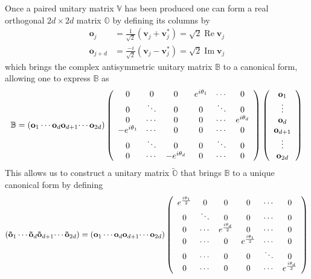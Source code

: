 \documentclass[aps,preprint]{revtex4}%
\begin{document}
Once a paired unitary matrix $\mathbb{V}$ has been produced one can form a
real orthogonal $2d\times2d$ matrix $\mathbb{O}$ by defining its columns by
\begin{align}
\mathbf{o}_{j}  &  =\frac{1}{\sqrt{2}}\left(  \mathbf{v}_{j}+\mathbf{v}%
_{j}^{\ast}\right)  =\sqrt{2}\operatorname{Re}\mathbf{v}_{j}\nonumber\\
\mathbf{o}_{j+d}  &  =\frac{-i}{\sqrt{2}}\left(  \mathbf{v}_{j}-\mathbf{v}%
_{j}^{\ast}\right)  =\sqrt{2}\operatorname{Im}\mathbf{v}_{j}%
\end{align}
which brings the complex antisymmetric unitary matrix $\mathbb{B}$ to a
canonical form, allowing one to express $\mathbb{B}$ as
\begin{equation}
\mathbb{B}=\left(  \mathbf{o}_{1}\cdots\mathbf{o}_{d}\mathbf{o}_{d+1}%
\mathbf{\cdots o}_{2d}\right)  \left(
\begin{array}
[c]{cccccc}%
0 & 0 & 0 & e^{i\theta_{1}} & \cdots & 0\\
0 & \ddots & 0 & 0 & \ddots & 0\\
0 & \cdots & 0 & 0 & \cdots & e^{i\theta_{d}}\\
-e^{i\theta_{1}} & \cdots & 0 & 0 & \cdots & 0\\
0 & \ddots & 0 & 0 & \ddots & 0\\
0 & \cdots & -e^{i\theta_{d}} & 0 & \cdots & 0
\end{array}
\right)  \left(
\begin{array}
[c]{c}%
\mathbf{o}_{1}\\
\vdots\\
\mathbf{o}_{d}\\
\mathbf{o}_{d+1}\\
\vdots\\
\mathbf{o}_{2d}%
\end{array}
\right)  \label{reex1}%
\end{equation}
This allows us to construct a unitary matrix $\widetilde{\mathbb{O}}$ that
brings $\mathbb{B}$ to a unique canonical form by defining
\begin{equation}
\left(  \mathbf{\tilde{o}}_{1}\cdots\mathbf{\tilde{o}}_{d}\mathbf{\tilde{o}%
}_{d+1}\mathbf{\cdots\tilde{o}}_{2d}\right)  =\left(  \mathbf{o}_{1}%
\cdots\mathbf{o}_{d}\mathbf{o}_{d+1}\mathbf{\cdots o}_{2d}\right)  \left(
\begin{array}
[c]{cccccc}%
e^{\frac{i\theta_{1}}{2}} & 0 & 0 & 0 & \cdots & 0\\
0 & \ddots & 0 & 0 & \cdots & 0\\
0 & \cdots & e^{\frac{i\theta_{d}}{2}} & 0 & \cdots & 0\\
0 & \cdots & 0 & e^{\frac{i\theta_{1}}{2}} & \cdots & 0\\
0 & \cdots & 0 & 0 & \ddots & 0\\
0 & \cdots & 0 & 0 & \cdots & e^{\frac{i\theta_{d}}{2}}%
\end{array}
\right)
\end{equation}
\end{document}
